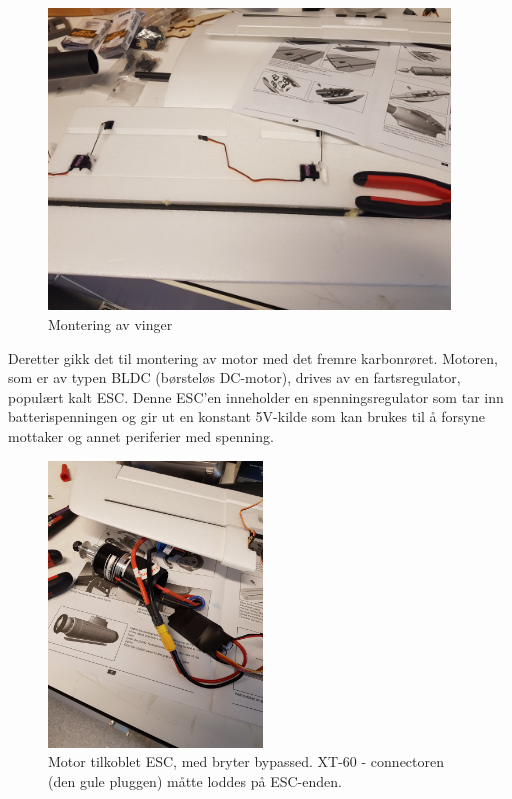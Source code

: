 \documentclass[12pt, a4paper]{report}
\begin{document}
\begin{figure}[ht]
	\centering
	\includegraphics[width=.6\textwidth,  height = 8cm]{bilder/vingemontering.jpg}
	\caption{Montering av vinger}
\end{figure}

\newpage
Deretter gikk det til montering av motor med det fremre karbonrøret. Motoren, som er av typen BLDC (børsteløs DC-motor), drives av en fartsregulator, populært kalt ESC. Denne ESC'en inneholder en spenningsregulator som tar inn batterispenningen og gir ut en konstant 5V-kilde som kan brukes til å forsyne mottaker og annet periferier med spenning. 

\begin{figure}[ht]
	\centering
	\includegraphics[height=7.6cm, width = .55\textwidth]{bilder/esc_og_motor.jpg}
	\caption{Motor tilkoblet ESC, med bryter bypassed. XT-60 - connectoren (den gule pluggen) måtte loddes på ESC-enden.}
\end{figure}
\end{document}
